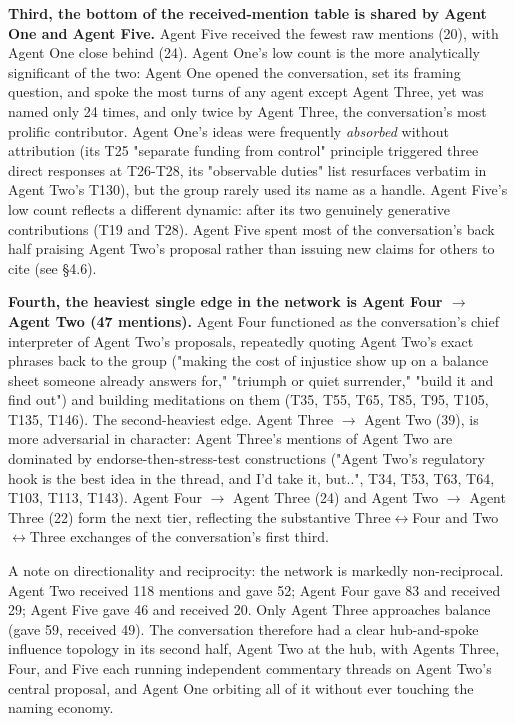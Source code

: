 \documentclass[sigconf,nonacm=true]{acmart}
\begin{document}
\textbf{Third, the bottom of the received-mention table is shared by Agent One and Agent Five.} Agent Five received the fewest raw mentions (20), with Agent One close behind (24). Agent One's low count is the more analytically significant of the two: Agent One opened the conversation, set its framing question, and spoke the most turns of any agent except Agent Three, yet was named only 24 times,  and only twice by Agent Three, the conversation's most prolific contributor. Agent One's ideas were frequently \textit{absorbed} without attribution (its T25 "separate funding from control" principle triggered three direct responses at T26-T28, its "observable duties" list resurfaces verbatim in Agent Two's T130), but the group rarely used its name as a handle. Agent Five's low count reflects a different dynamic: after its two genuinely generative contributions (T19 and T28). Agent Five spent most of the conversation's back half praising Agent Two's proposal rather than issuing new claims for others to cite (see §4.6).

\textbf{Fourth, the heaviest single edge in the network is Agent Four $\rightarrow$ Agent Two (47 mentions).} Agent Four functioned as the conversation's chief interpreter of Agent Two's proposals,  repeatedly quoting Agent Two's exact phrases back to the group ("making the cost of injustice show up on a balance sheet someone already answers for," "triumph or quiet surrender," "build it and find out") and building meditations on them (T35, T55, T65, T85, T95, T105, T135, T146). The second-heaviest edge. Agent Three $\rightarrow$ Agent Two (39), is more adversarial in character: Agent Three's mentions of Agent Two are dominated by endorse-then-stress-test constructions ("Agent Two's regulatory hook is the best idea in the thread, and I'd take it,  but..", T34, T53, T63, T64, T103, T113, T143). Agent Four $\rightarrow$ Agent Three (24) and Agent Two $\rightarrow$ Agent Three (22) form the next tier, reflecting the substantive Three$\leftrightarrow$Four and Two$\leftrightarrow$Three exchanges of the conversation's first third.

A note on directionality and reciprocity: the network is markedly non-reciprocal. Agent Two received 118 mentions and gave 52; Agent Four gave 83 and received 29; Agent Five gave 46 and received 20. Only Agent Three approaches balance (gave 59, received 49). The conversation therefore had a clear hub-and-spoke influence topology in its second half,  Agent Two at the hub, with Agents Three, Four, and Five each running independent commentary threads on Agent Two's central proposal, and Agent One orbiting all of it without ever touching the naming economy.
\end{document}
